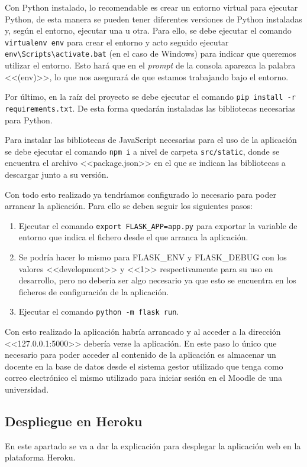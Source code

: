 Con Python instalado, lo recomendable es crear un entorno virtual para ejecutar Python, de esta manera se pueden tener diferentes versiones de Python instaladas y, según el entorno, ejecutar una u otra.
Para ello, se debe ejecutar el comando \texttt{virtualenv env} para crear el entorno y acto seguido ejecutar \texttt{env\textbackslash{}Scripts\textbackslash{}activate.bat} (en el caso de Windows) para indicar que queremos utilizar el entorno.
Esto hará que en el \textit{prompt} de la consola aparezca la palabra <<(env)>>, lo que nos asegurará de que estamos trabajando bajo el entorno.

Por último, en la raíz del proyecto se debe ejecutar el comando \texttt{pip install -r requirements.txt}.
De esta forma quedarán instaladas las bibliotecas necesarias para Python.

Para instalar las bibliotecas de JavaScript necesarias para el uso de la aplicación se debe ejecutar el comando \texttt{npm i} a nivel de carpeta \texttt{src/static}, donde se encuentra el archivo <<package.json>> en el que se indican las bibliotecas a descargar junto a su versión. 

Con todo esto realizado ya tendríamos configurado lo necesario para poder arrancar la aplicación.
Para ello se deben seguir los siguientes pasos:
\begin{enumerate}
\item Ejecutar el comando \texttt{export FLASK\_APP=app.py} para exportar la variable de entorno que indica el fichero desde el que arranca la aplicación.
\item Se podría hacer lo mismo para FLASK\_ENV y FLASK\_DEBUG con los valores <<development>> y <<1>> respectivamente para su uso en desarrollo, pero no debería ser algo necesario ya que esto se encuentra en los ficheros de configuración de la aplicación.
\item Ejecutar el comando \texttt{python -m flask run}.
\end{enumerate}

Con esto realizado la aplicación habría arrancado y al acceder a la dirección <<127.0.0.1:5000>> debería verse la aplicación.
En este paso lo único que necesario para poder acceder al contenido de la aplicación es almacenar un docente en la base de datos desde el sistema gestor utilizado que tenga como correo electrónico el mismo utilizado para iniciar sesión en el Moodle de una universidad.

\subsection{Despliegue en Heroku}
En este apartado se va a dar la explicación para desplegar la aplicación web en la plataforma Heroku.

